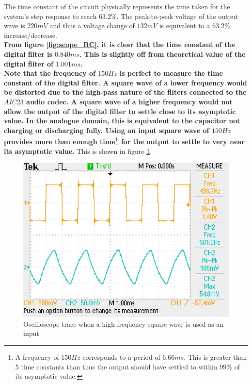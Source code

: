 \documentclass{article}
\begin{document}
The time constant of the circuit physically represents the time taken for the system's step response to reach $63.2\%$. The peak-to-peak voltage of the output wave is $220mV$ and thus a voltage change of $132mV$ is equivalent to  a $63.2\%$ increase/decrease.\\

\textbf{From figure \ref{fig:scope_RC}, it is clear that the time constant of the digital filter is $0.840ms$. This is slightly off from theoretical value of the digital filter of $1.001ms$.}\\

\textbf{Note that the frequency of $150Hz$ is perfect to measure the time constant of the digital filter. A square wave of a lower frequency would be distorted due to the high-pass nature of the filters connected to the $AIC23$ audio codec. A square wave of a higher frequency would not allow the output of the digital filter to settle close to its asymptotic value. In the analogue domain, this is equivalent to the capacitor not charging or discharging fully. Using an input square wave of $150Hz$ provides more than enough time\footnote{A frequency of $150Hz$ corresponds to a period of $6.66ms$. This is greater than 5 time constants than thus the output should have settled to within $99\%$ of its asymptotic value.} for the output to settle to very near its asymptotic value.} This is shown in figure \ref{fig:high_frequency_input}.

\begin{figure}[H]
    \centering
    \includegraphics{Clipping}
    \caption{Oscilloscope trace when a high frequency square wave is used as an input}
    \label{fig:high_frequency_input}
\end{figure}
\end{document}
